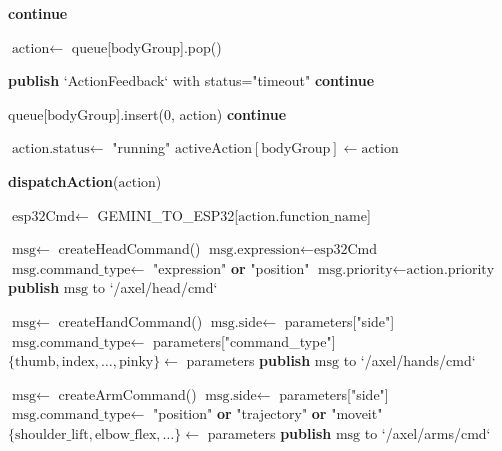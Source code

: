 \documentclass{article}
\begin{document}
\begin{algorithm}
\begin{algorithmic}[1]
            \State \textbf{continue}
        \EndIf
        
        \State $\text{action} \gets$ queue[$\text{bodyGroup}$].pop() 
        
            \State \textbf{publish} `ActionFeedback` with status="timeout"
            \State \textbf{continue}
        \EndIf
        
            \State queue[$\text{bodyGroup}$].insert(0, action) 
            \State \textbf{continue}
        \EndIf
        
        \State $\text{action.status} \gets$ "running"
        \State $\text{activeAction}[\text{bodyGroup}] \gets \text{action}$
        
        \State \textbf{dispatchAction}($\text{action}$) 
        
    \EndFor
\EndProcedure

\newline

    \State $\text{esp32Cmd} \gets$ GEMINI\_TO\_ESP32[$\text{action.function\_name}$]
    
            \State $\text{msg} \gets$ createHeadCommand()
            \State $\text{msg.expression} \gets \text{esp32Cmd}$
            \State $\text{msg.command\_type} \gets$ "expression" \textbf{or} "position"
            \State $\text{msg.priority} \gets \text{action.priority}$
            \State \textbf{publish} $\text{msg}$ to `/axel/head/cmd`
        \EndCase
        
            \State $\text{msg} \gets$ createHandCommand()
            \State $\text{msg.side} \gets$ parameters["side"] 
            \State $\text{msg.command\_type} \gets$ parameters["command\_type"]
            \State $\{\text{thumb}, \text{index}, \ldots, \text{pinky}\} \gets$ parameters
            \State \textbf{publish} $\text{msg}$ to `/axel/hands/cmd`
        \EndCase
        
            \State $\text{msg} \gets$ createArmCommand()
            \State $\text{msg.side} \gets$ parameters["side"]
            \State $\text{msg.command\_type} \gets$ "position" \textbf{or} "trajectory" \textbf{or} "moveit"
            \State $\{\text{shoulder\_lift}, \text{elbow\_flex}, \ldots\} \gets$ parameters
            \State \textbf{publish} $\text{msg}$ to `/axel/arms/cmd`
        \EndCase
        

\end{algorithmic}
\end{algorithm}
\end{document}
